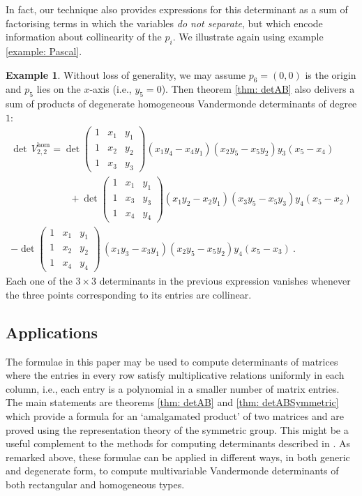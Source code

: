 \documentclass[10pt]{amsart}
\theoremstyle{definition}
\newtheorem{example}[thm]{Example}
\theoremstyle{remark}
\numberwithin{equation}{section}
\newcommand{\0}{\color{blue}{\mathsf{0}}}
\begin{document}
In fact, our technique also provides expressions for this determinant as a sum of factorising terms in which the variables \emph{do not separate}, but which  encode information about collinearity of the $p_i$. We illustrate again using  example \ref{example: Pascal}. 




\begin{example} 
Without loss of generality, we may assume $p_6 =(0,0)$ is  the origin and $p_5$ lies on the $x$-axis (i.e.,  $y_5=0$). Then theorem \ref{thm: detAB} also
 delivers a sum of products  of   degenerate  homogeneous Vandermonde determinants of degree $1$:
\begin{multline}  \det\, V^{\mathrm{hom}}_{2,2} =    \det  \begin{pmatrix} 1 & x_1 & y_1\\
1& x_2 & y_2\\
1& x_3 & y_3 \end{pmatrix} (x_1 y_4 - x_4 y_1) (x_2 y_5 -x_5 y_2) y_3 (x_5-x_4) \\
\qquad \qquad  \qquad  +  \det  \begin{pmatrix} 1 & x_1 & y_1\\
1& x_3 & y_3\\
1& x_4 & y_4 \end{pmatrix}  (x_1 y_2 - x_2 y_1) (x_3 y_5 -x_5 y_3)  y_4 (x_5-x_2)  \\
   -    \det  \begin{pmatrix} 1 & x_1 & y_1\\
1& x_2 & y_2\\
1& x_4 & y_4 \end{pmatrix}   \,  (x_1 y_3 - x_3 y_1) (x_2 y_5 -x_5 y_2)   y_4 (x_5-x_3) \ .   
   \end{multline}
   Each one of the  $3\times 3$ determinants in the previous expression vanishes whenever the three points corresponding to its entries are collinear.
   \end{example}






\subsection{Applications}
The formulae in this paper may be used to compute determinants of matrices where the entries in every row satisfy multiplicative relations uniformly in each column, i.e., each entry is a polynomial in a smaller number of matrix entries. 
The main statements are 
theorems \ref{thm: detAB} and \ref{thm: detABSymmetric} which provide a formula for an `amalgamated product' of two matrices and are proved using the representation theory of the symmetric group. This might be a useful complement to the  methods for computing determinants described in \cite{Krattenthaler,Krattenthaler2}.  As remarked above, these formulae can be applied in different ways, in both generic and degenerate form, to compute multivariable Vandermonde determinants of both rectangular and homogeneous types. 
\end{document}
